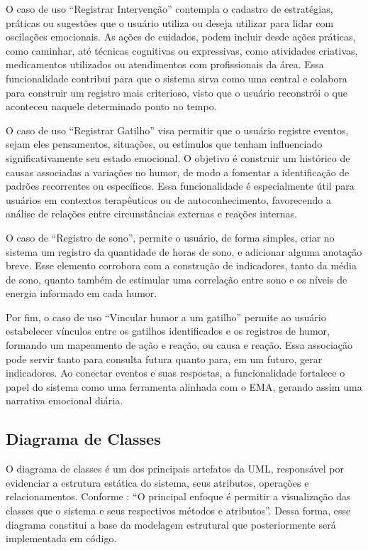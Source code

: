 O caso de uso ``Registrar Intervenção'' contempla o cadastro de estratégias,
práticas ou sugestões que o usuário utiliza ou deseja utilizar para lidar com
oscilações emocionais. As ações de cuidados, podem incluir desde ações
práticas, como caminhar, até técnicas cognitivas ou expressivas, como
atividades criativas, medicamentos utilizados ou atendimentos com profissionais
da área. Essa funcionalidade contribui para que o sistema sirva como uma
central e colabora para construir um registro mais criterioso, visto que o
usuário reconstrói o que aconteceu naquele determinado ponto no tempo.

O caso de uso ``Registrar Gatilho'' visa permitir que o usuário registre
eventos, sejam eles pensamentos, situações, ou estímulos que tenham
influenciado significativamente seu estado emocional. O objetivo é construir um
histórico de causas associadas a variações no humor, de modo a fomentar a
identificação de padrões recorrentes ou específicos. Essa funcionalidade é
especialmente útil para usuários em contextos terapêuticos ou de
autoconhecimento, favorecendo a análise de relações entre circunstâncias
externas e reações internas.

O caso de ``Registro de sono'', permite o usuário, de forma simples, criar no
sistema um registro da quantidade de horas de sono, e adicionar alguma anotação
breve. Esse elemento corrobora com a construção de indicadores, tanto da média
de sono, quanto também de estimular uma correlação entre sono e os níveis de
energia informado em cada humor.

Por fim, o caso de uso ``Vincular humor a um gatilho'' permite ao usuário
estabelecer vínculos entre os gatilhos identificados e os registros de humor,
formando um mapeamento de ação e reação, ou causa e reação. Essa associação
pode servir tanto para consulta futura quanto para, em um futuro, gerar
indicadores. Ao conectar eventos e suas respostas, a funcionalidade fortalece o
papel do sistema como uma ferramenta alinhada com o EMA, gerando assim uma
narrativa emocional diária.

\subsection{Diagrama de Classes}

O diagrama de classes é um dos principais artefatos da UML, responsável por
evidenciar a estrutura estática do sistema, seus atributos, operações e
relacionamentos. Conforme \cite[p. 101]{guedes:2022}: ``O principal enfoque é
permitir a visualização das classes que o sistema e seus respectivos métodos e
atributos''. Dessa forma, esse diagrama constitui a base da modelagem
estrutural que posteriormente será implementada em código.

